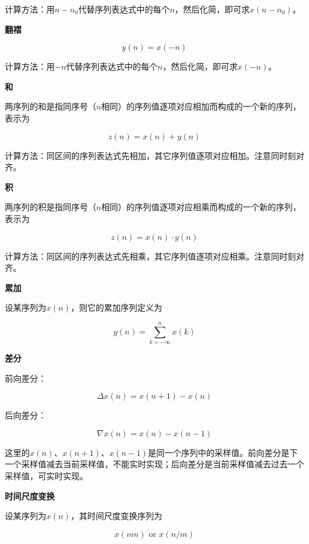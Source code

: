 \documentclass[cn, hazy, blue, normal, 14pt]{elegantnote}
\begin{document}
计算方法：用$n-n_0$代替序列表达式中的每个$n$，然后化简，即可求$x(n-n_0)$。

\textbf{翻褶}

\begin{equation}
        y(n)=x(-n)
\end{equation}

计算方法：用$-n$代替序列表达式中的每个$n$，然后化简，即可求$x(-n)$。

\textbf{和}

两序列的和是指同序号（$n$相同）的序列值逐项对应相加而构成的一个新的序列，表示为

\begin{equation}
        z(n)=x(n)+y(n)
\end{equation}

计算方法：同区间的序列表达式先相加，其它序列值逐项对应相加。注意同时刻对齐。 

\textbf{积}

两序列的积是指同序号（$n$相同）的序列值逐项对应相乘而构成的一个新的序列，表示为

\begin{equation}
        z(n)=x(n)\cdot y(n)
\end{equation}

计算方法：同区间的序列表达式先相乘，其它序列值逐项对应相乘。注意同时刻对齐。

\textbf{累加}

设某序列为$x(n)$，则它的累加序列定义为

\begin{equation}
        y(n)=\sum_{k=-\infty}^n x(k)
\end{equation}

\textbf{差分}

前向差分：

\begin{equation}
        \Delta x(n)=x(n+1)-x(n)
\end{equation}

后向差分：

\begin{equation}
        \nabla x(n)=x(n)-x(n-1)
\end{equation}

这里的$x(n)$、$x(n+1)$、$x(n-1)$是同一个序列中的采样值。前向差分是下一个采样值减去当前采样值，不能实时实现；后向差分是当前采样值减去过去一个采样值，可实时实现。 

\textbf{时间尺度变换}

设某序列为$x(n)$，其时间尺度变换序列为

\begin{equation}
        x(mn) \text{ or } x(n/m)
\end{equation}
\end{document}
